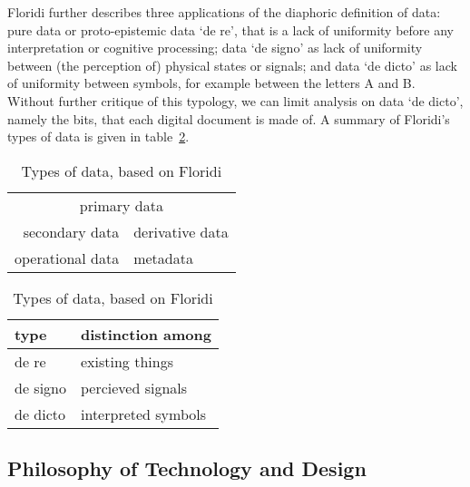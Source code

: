 Floridi further describes three applications of the diaphoric definition of 
data: pure data or proto-epistemic data `de re', that is a lack of uniformity 
before any interpretation or cognitive processing; data `de signo' as lack of 
uniformity between (the perception of) physical states or signals; and data 
`de dicto' as lack of uniformity between symbols, for example between the 
letters A and B. Without further critique of this typology, we can limit 
analysis on data `de dicto', namely the bits, that each digital document is
made of. A summary of Floridi's types of data is given in 
table~\ref{tab:floridisdatatypes}.

\begin{table}
\begin{minipage}[t]{0.45\linewidth}
\renewcommand{\arraystretch}{1.3}
\begin{tabular}{|rl|}
\hline
\multicolumn{2}{|c|}{primary data} \\
secondary data\hspace{6mm} & \hspace{4mm}derivative data \\
operational data & metadata \\
\hline
\end{tabular}
\renewcommand{\arraystretch}{1.0}
\end{minipage}
\begin{minipage}[t]{0.5\linewidth}
\raggedleft
\begin{tabular}{|l|l|}
\hline
type     & distinction among \\
\hline
de re    & existing things \\
de signo & percieved signals \\
de dicto & interpreted symbols \\
\hline
\end{tabular}
\end{minipage}
\caption{Types of data, based on Floridi}
\label{tab:floridisdatatypes}
\end{table}


\subsection{Philosophy of Technology and Design}

